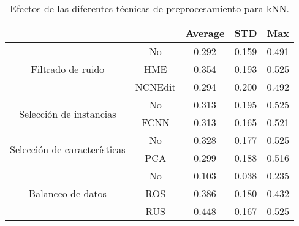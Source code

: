 \begin{table}[t]
    \centering
    \begin{tabular}{cc|c|c|c|}
    \cline{3-5}
    \multicolumn{1}{l}{\textbf{}} & \textbf{} & \multicolumn{1}{c|}{\textbf{Average}} & \multicolumn{1}{c|}{\textbf{STD}} & \textbf{Max} \\ \hline
    \multicolumn{1}{|c|}{\multirow{3}{*}{Filtrado de ruido}}       & No        & 0.292  & 0.159
    & 0.491    \\ \cline{2-5} 
    \multicolumn{1}{|c|}{}  & HME       & 0.354   & 0.193
    & 0.525        \\ \cline{2-5} 
    \multicolumn{1}{|c|}{}  & NCNEdit   & 0.294  & 0.200
    & 0.492        \\ \hline
    \multicolumn{1}{|c|}{\multirow{2}{*}{Selección de instancias}} & No        & 0.313    &  0.195
    & 0.525        \\ \cline{2-5} 
    \multicolumn{1}{|c|}{}  & FCNN      & 0.313   &  0.165
    & 0.521        \\ \hline
    \multicolumn{1}{|c|}{\multirow{2}{*}{Selección de características}} & No        & 0.328    & 0.177
    & 0.525        \\ \cline{2-5} 
    \multicolumn{1}{|c|}{}  & PCA      & 0.299   & 0.188
    & 0.516        \\ \hline
    \multicolumn{1}{|c|}{\multirow{3}{*}{Balanceo de datos}}       & No        & 0.103     &  0.038
    & 0.235        \\ \cline{2-5} 
    \multicolumn{1}{|c|}{}  & ROS       & 0.386  & 0.180
    & 0.432        \\ \cline{2-5} 
    \multicolumn{1}{|c|}{}  & RUS       & 0.448  & 0.167
    & 0.525        \\ \hline
    \end{tabular}
    \caption{Efectos de las diferentes técnicas de preprocesamiento para kNN.}
    \label{knn}
\end{table}
